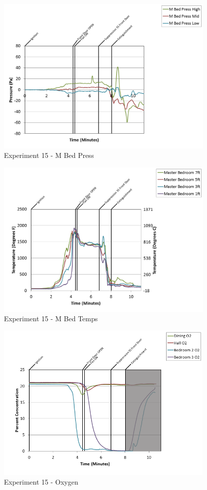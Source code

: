 \documentclass{article}
\begin{document}
\begin{appendices}
\clearpage

\begin{figure}[h!]
	\centering
	\includegraphics[height=3.05in]{0_Images/Results_Charts/Exp_15_Charts/MBedPress.png}
	\caption{Experiment 15 - M Bed Press}
\end{figure}


\begin{figure}[h!]
	\centering
	\includegraphics[height=3.05in]{0_Images/Results_Charts/Exp_15_Charts/MBedTemps.png}
	\caption{Experiment 15 - M Bed Temps}
\end{figure}

\clearpage

\begin{figure}[h!]
	\centering
	\includegraphics[height=3.05in]{0_Images/Results_Charts/Exp_15_Charts/Oxygen.png}
	\caption{Experiment 15 - Oxygen}
\end{figure}



\end{appendices}
\end{document}
